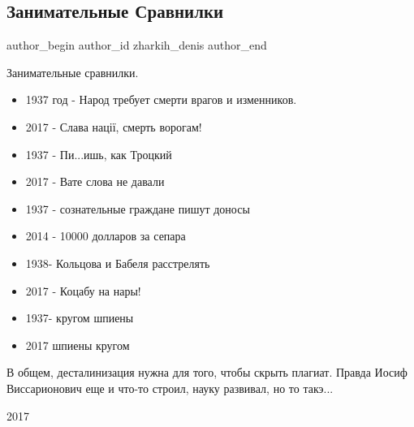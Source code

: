  
 
 
 
 
 
\subsection{Занимательные Сравнилки}
\label{sec:08_06_2021.fb.zharkih_denis.1.sravnilki}
\ifcmt
 author_begin
   author_id zharkih_denis
 author_end
\fi

Занимательные сравнилки.

\begin{itemize}
\item 1937 год - Народ требует смерти врагов и изменников. 
\item 2017 - Слава нації, смерть ворогам!
\item 1937 - Пи...ишь, как Троцкий
\item 2017 - Вате слова не давали
\item 1937 - сознательные граждане пишут доносы
\item 2014 - 10000 долларов за сепара
\item 1938- Кольцова и Бабеля расстрелять
\item 2017 - Коцабу на нары!
\item 1937- кругом шпиены
\item 2017 шпиены кругом
\end{itemize}

В общем, десталинизация нужна для того, чтобы скрыть плагиат. Правда Иосиф
Виссарионович еще и что-то строил, науку развивал, но то такэ...

2017
